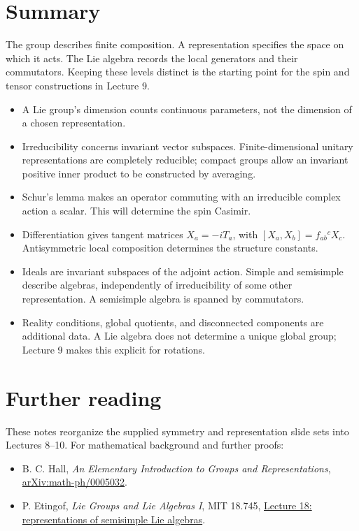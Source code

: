 \documentclass[11pt]{article}
\begin{document}
\clearpage
\section*{Summary}
\begin{keyidea}
The group describes finite composition. A representation specifies the
space on which it acts. The Lie algebra records the local generators
and their commutators. Keeping these levels distinct is the starting
point for the spin and tensor constructions in Lecture 9.
\end{keyidea}
\begin{itemize}
\item A Lie group's dimension counts continuous parameters, not the
dimension of a chosen representation.
\item Irreducibility concerns invariant vector subspaces. Finite-dimensional
unitary representations are completely reducible; compact groups allow
an invariant positive inner product to be constructed by averaging.
\item Schur's lemma makes an operator commuting with an irreducible
complex action a scalar. This will determine the spin Casimir.
\item Differentiation gives tangent matrices \(X_a=-iT_a\), with
\([X_a,X_b]=f_{ab}{}^cX_c\). Antisymmetric local composition determines
the structure constants.
\item Ideals are invariant subspaces of the adjoint action. Simple and
semisimple describe algebras, independently of irreducibility of some
other representation. A semisimple algebra is spanned by commutators.
\item Reality conditions, global quotients, and disconnected components
are additional data. A Lie algebra does not determine a unique global
group; Lecture 9 makes this explicit for rotations.
\end{itemize}

\section*{Further reading}
These notes reorganize the supplied symmetry and representation slide
sets into Lectures 8--10. For mathematical background and further proofs:
\begin{itemize}
\item B. C. Hall, \emph{An Elementary Introduction to Groups and
Representations}, \href{https://arxiv.org/abs/math-ph/0005032}{arXiv:math-ph/0005032}.
\item P. Etingof, \emph{Lie Groups and Lie Algebras I}, MIT 18.745,
\href{https://ocw.mit.edu/courses/18-745-lie-groups-and-lie-algebras-i-fall-2020/mit18_745_f20_lec18.pdf}{Lecture 18: representations of semisimple Lie algebras}.
\end{itemize}
\end{document}
